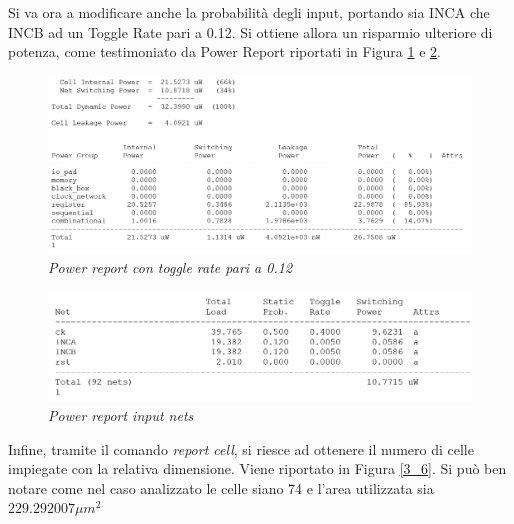 Si va ora a modificare anche la probabilità degli input, portando sia INCA che INCB ad un Toggle Rate pari a 0.12. Si ottiene allora un risparmio ulteriore di potenza, come testimoniato da Power Report riportati in Figura \ref{3_4} e \ref{3_5}.
\begin{figure}[!htb]
	\centering
	\includegraphics[scale=0.8]{immagini/3_4}
	\caption{\textit{Power report con toggle rate pari a 0.12}}
	\label{3_4}
\end{figure}
\begin{figure}[!htb]
	\centering
	\includegraphics[scale=0.9]{immagini/3_5}
	\caption{\textit{Power report input nets}}
	\label{3_5}
\end{figure}
\newpage
\noindent Infine, tramite il comando \textit{report cell}, si riesce ad ottenere il numero di celle impiegate con la relativa dimensione. Viene riportato in Figura \ref{3_6}. Si può ben notare come nel caso analizzato le celle siano 74 e l'area utilizzata sia $229.292007 \mu m^{2}$ \\
